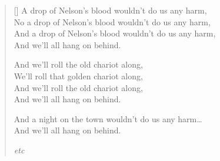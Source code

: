 \settowidth{\versewidth}{A drop of Nelson's blood wouldn't do us any harm}
\begin{verse}[\versewidth]
A drop of Nelson's blood wouldn't do us any harm,\\
No a drop of Nelson's blood wouldn't do us any harm,\\
And a drop of Nelson's blood wouldn't do us any harm,\\
And we'll all hang on behind.

\begin{chorus}
And we'll roll the old chariot along,\\
We'll roll that golden chariot along,\\
And we'll roll the old chariot along,\\
And we'll all hang on behind.
\end{chorus}

And a night on the town wouldn't do us any harm\dots\\
And we'll all hang on behind.

\textit{etc}

\end{verse}
